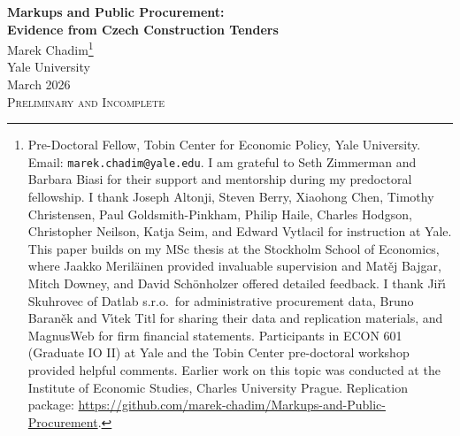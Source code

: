 \documentclass[11pt]{article}
\begin{document}
\begin{center}
{\LARGE\bfseries Markups and Public Procurement:\\[4pt]
Evidence from Czech Construction Tenders}\\[16pt]
{\large Marek Chadim\footnote{Pre-Doctoral Fellow, Tobin Center for Economic Policy, Yale University. Email: \texttt{marek.chadim@yale.edu}. I am grateful to Seth Zimmerman and Barbara Biasi for their support and mentorship during my predoctoral fellowship. I thank Joseph Altonji, Steven Berry, Xiaohong Chen, Timothy Christensen, Paul Goldsmith-Pinkham, Philip Haile, Charles Hodgson, Christopher Neilson, Katja Seim, and Edward Vytlacil for instruction at Yale. This paper builds on my MSc thesis at the Stockholm School of Economics, where Jaakko Meril\"ainen provided invaluable supervision and Mat\v{e}j Bajgar, Mitch Downey, and David Sch\"onholzer offered detailed feedback. I thank Ji\v{r}\'{\i} Skuhrovec of Datlab s.r.o.\ for administrative procurement data, Bruno Baran\v{e}k and V\'{\i}tek Titl for sharing their data and replication materials, and MagnusWeb for firm financial statements. Participants in ECON 601 (Graduate IO II) at Yale and the Tobin Center pre-doctoral workshop provided helpful comments. Earlier work on this topic was conducted at the Institute of Economic Studies, Charles University Prague. Replication package: \url{https://github.com/marek-chadim/Markups-and-Public-Procurement}.}}\\[8pt]
{\normalsize Yale University}\\[12pt]
{\normalsize March 2026}\\[8pt]
{\normalsize\textsc{Preliminary and Incomplete}}
\end{center}

\bigskip
\end{document}
